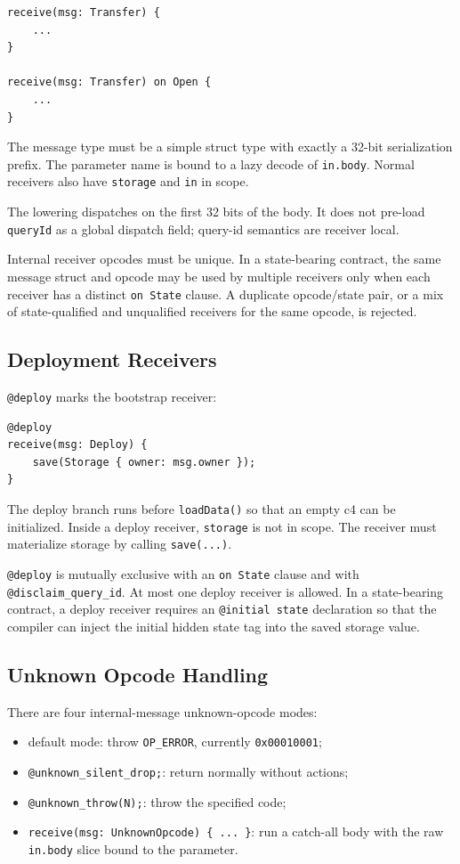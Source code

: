 \documentclass[12pt,oneside]{article}
\begin{document}
\begin{verbatim}
receive(msg: Transfer) {
    ...
}

receive(msg: Transfer) on Open {
    ...
}
\end{verbatim}

The message type must be a simple struct type with exactly a 32-bit
serialization prefix. The parameter name is bound to a lazy decode of
\verb|in.body|. Normal receivers also have \verb|storage| and \verb|in| in
scope.

The lowering dispatches on the first 32 bits of the body. It does not pre-load
\verb|queryId| as a global dispatch field; query-id semantics are receiver
local.

Internal receiver opcodes must be unique. In a state-bearing contract, the
same message struct and opcode may be used by multiple receivers only when
each receiver has a distinct \verb|on State| clause. A duplicate
opcode/state pair, or a mix of state-qualified and unqualified receivers for
the same opcode, is rejected.

\subsection{Deployment Receivers}
\verb|@deploy| marks the bootstrap receiver:

\begin{verbatim}
@deploy
receive(msg: Deploy) {
    save(Storage { owner: msg.owner });
}
\end{verbatim}

The deploy branch runs before \verb|loadData()| so that an empty c4 can be
initialized. Inside a deploy receiver, \verb|storage| is not in scope. The
receiver must materialize storage by calling \verb|save(...)|.

\verb|@deploy| is mutually exclusive with an \verb|on State| clause and with
\verb|@disclaim_query_id|. At most one deploy receiver is allowed. In a
state-bearing contract, a deploy receiver requires an \verb|@initial state|
declaration so that the compiler can inject the initial hidden state tag into
the saved storage value.

\subsection{Unknown Opcode Handling}
There are four internal-message unknown-opcode modes:

\begin{itemize}
\item default mode: throw \verb|OP_ERROR|, currently \verb|0x00010001|;
\item \verb|@unknown_silent_drop;|: return normally without actions;
\item \verb|@unknown_throw(N);|: throw the specified code;
\item \verb|receive(msg: UnknownOpcode) { ... }|: run a catch-all body with
the raw \verb|in.body| slice bound to the parameter.
\end{itemize}
\end{document}
